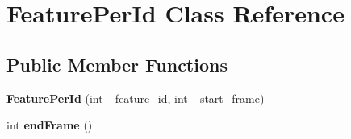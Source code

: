 \hypertarget{classFeaturePerId}{}\section{Feature\+Per\+Id Class Reference}
\label{classFeaturePerId}
\subsection*{Public Member Functions}
\begin{DoxyCompactItemize}
\item 
\mbox{\label{classFeaturePerId_a73653614e9eddeb597e6102e21c44d1f}} 
{\bfseries Feature\+Per\+Id} (int \+\_\+feature\+\_\+id, int \+\_\+start\+\_\+frame)
\item 
\mbox{\label{classFeaturePerId_a38953bada45472ff209f1dffea2ccf4e}} 
int {\bfseries end\+Frame} ()
\end{DoxyCompactItemize}
